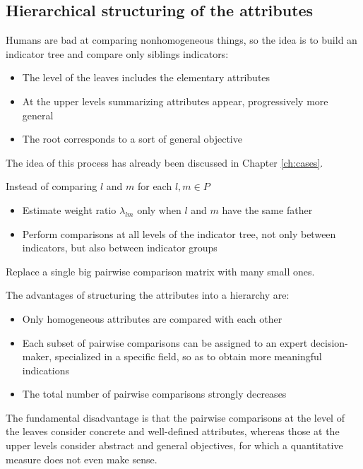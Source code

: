 \subsection{Hierarchical structuring of the attributes}

Humans are bad at comparing nonhomogeneous things, so the idea is to build an indicator tree and compare only siblings indicators:
\begin{itemize}
	\item The level of the leaves includes the elementary attributes
	
	\item At the upper levels summarizing attributes appear, progressively more general
	
	\item The root corresponds to a sort of general objective
\end{itemize}

The idea of this process has already been discussed in Chapter \ref{ch:cases}.

Instead of comparing $l$ and $m$ for each $l,m \in P$
\begin{itemize}
	\item Estimate weight ratio $\lambda_{lm}$ only when $l$ and $m$ have the same father
	
	\item Perform comparisons at all levels of the indicator tree, not only between indicators, but also between indicator groups
\end{itemize}
Replace a single big pairwise comparison matrix with many small ones.

The advantages of structuring the attributes into a hierarchy are:
\begin{itemize}
	\item Only homogeneous attributes are compared with each other
	
	\item Each subset of pairwise comparisons can be assigned to an expert decision-maker, specialized in a specific field, so as to obtain more meaningful indications
	
	\item The total number of pairwise comparisons strongly decreases
\end{itemize}

The fundamental disadvantage is that the pairwise comparisons at the level of the leaves consider concrete and well-defined attributes, whereas those at the upper levels consider abstract and general objectives, for which a quantitative measure does not even make sense.

